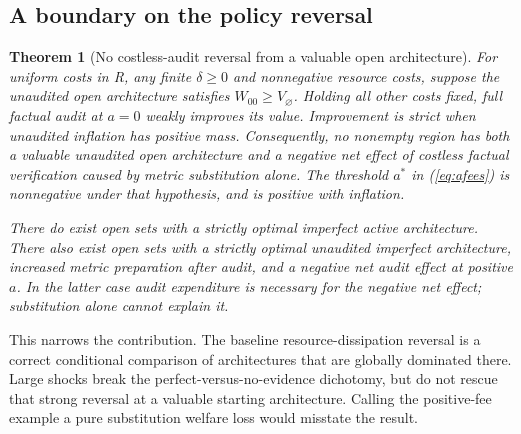 \documentclass[11pt]{article}
\newtheorem{theorem}{Theorem}
\begin{document}
\subsection{A boundary on the policy reversal}\label{subsec:boundary}
\begin{theorem}[No costless-audit reversal from a valuable open architecture]\label{thm:boundary}
For uniform costs in R, any finite $\delta\geq0$ and nonnegative resource costs, suppose the unaudited open architecture satisfies $W_{00}\geq V_\varnothing$. Holding all other costs fixed, full factual audit at $a=0$ weakly improves its value. Improvement is strict when unaudited inflation has positive mass. Consequently, no nonempty region has both a valuable unaudited open architecture and a negative net effect of costless factual verification caused by metric substitution alone. The threshold $a^*$ in (\ref{eq:afees}) is nonnegative under that hypothesis, and is positive with inflation.

There do exist open sets with a strictly optimal imperfect active architecture. There also exist open sets with a strictly optimal unaudited imperfect architecture, increased metric preparation after audit, and a negative net audit effect at positive $a$. In the latter case audit expenditure is necessary for the negative net effect; substitution alone cannot explain it.
\end{theorem}
This narrows the contribution. The baseline resource-dissipation reversal is a correct conditional comparison of architectures that are globally dominated there. Large shocks break the perfect-versus-no-evidence dichotomy, but do not rescue that strong reversal at a valuable starting architecture. Calling the positive-fee example a pure substitution welfare loss would misstate the result.
\end{document}
